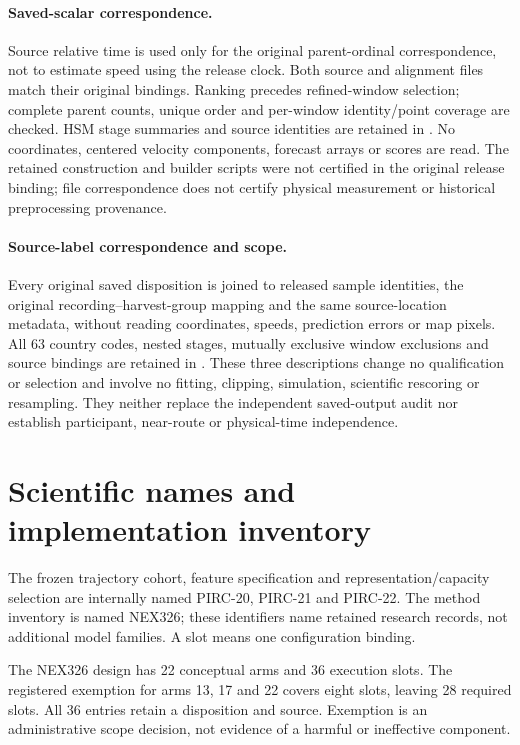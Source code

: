 \paragraph{Saved-scalar correspondence.}
Source relative time is used only for the original parent-ordinal
correspondence, not to estimate speed using the release clock. Both source
and alignment files match their original bindings. Ranking precedes
refined-window selection; complete parent counts, unique order and
per-window identity/point coverage are checked. HSM stage summaries and
source identities are retained in
.
No coordinates, centered velocity components, forecast arrays or scores
are read. The retained construction and builder scripts were not certified
in the original release binding; file correspondence does not certify
physical measurement or historical preprocessing provenance.

\paragraph{Source-label correspondence and scope.}
Every original saved disposition is joined to released sample identities,
the original recording--harvest-group mapping and the same source-location
metadata, without reading coordinates, speeds, prediction errors or map pixels.
All 63 country codes, nested stages, mutually exclusive window exclusions
and source bindings are retained in
.
These three descriptions change no qualification or selection and involve
no fitting, clipping, simulation, scientific rescoring or resampling.
They neither replace the independent saved-output audit nor establish
participant, near-route or physical-time independence.



\section{Scientific names and implementation inventory}
\label{sec:method-implementation-map}\hypertarget{sec:method-implementation-map}{}
The frozen trajectory cohort, feature specification and representation/capacity
selection are internally named PIRC-20, PIRC-21 and PIRC-22. The method
inventory is named NEX326; these identifiers name retained research records,
not additional model families. A slot means one configuration binding.

The NEX326 design has 22 conceptual arms and 36 execution slots. The registered
exemption for arms 13, 17 and 22 covers eight slots, leaving 28 required slots.
All 36 entries retain a disposition and source. Exemption is an administrative
scope decision, not evidence of a harmful or ineffective component.

